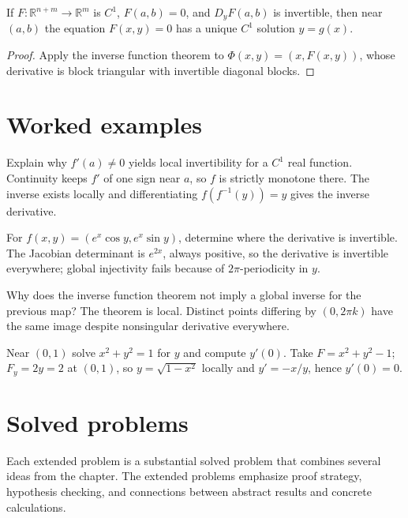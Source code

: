 \begin{theorem}\label{thm:ii09-03}
If $F:\mathbb R^{n+m}\to\mathbb R^m$ is $C^1$, $F(a,b)=0$, and $D_yF(a,b)$ is invertible, then near $(a,b)$ the equation $F(x,y)=0$ has a unique $C^1$ solution $y=g(x)$.
\begin{proof}
Apply the inverse function theorem to $\Phi(x,y)=(x,F(x,y))$, whose derivative is block triangular with invertible diagonal blocks.
\end{proof}
\end{theorem}

\section{Worked examples}

\begin{example}\label{ex:ii09-worked-01}
Explain why $f'(a)\ne0$ yields local invertibility for a $C^1$ real function. Continuity keeps $f'$ of one sign near $a$, so $f$ is strictly monotone there. The inverse exists locally and differentiating $f(f^{-1}(y))=y$ gives the inverse derivative.
\end{example}

\begin{example}\label{ex:ii09-worked-02}
For $f(x,y)=(e^x\cos y,e^x\sin y)$, determine where the derivative is invertible. The Jacobian determinant is $e^{2x}$, always positive, so the derivative is invertible everywhere; global injectivity fails because of $2\pi$-periodicity in $y$.
\end{example}

\begin{example}\label{ex:ii09-worked-03}
Why does the inverse function theorem not imply a global inverse for the previous map? The theorem is local. Distinct points differing by $(0,2\pi k)$ have the same image despite nonsingular derivative everywhere.
\end{example}

\begin{example}\label{ex:ii09-worked-04}
Near $(0,1)$ solve $x^2+y^2=1$ for $y$ and compute $y'(0)$. Take $F=x^2+y^2-1$; $F_y=2y=2$ at $(0,1)$, so $y=\sqrt{1-x^2}$ locally and $y'=-x/y$, hence $y'(0)=0$.
\end{example}

\section{Solved problems}
Each extended problem is a substantial solved problem that combines several ideas from the chapter. The extended problems emphasize proof strategy, hypothesis checking, and connections between abstract results and concrete calculations.

